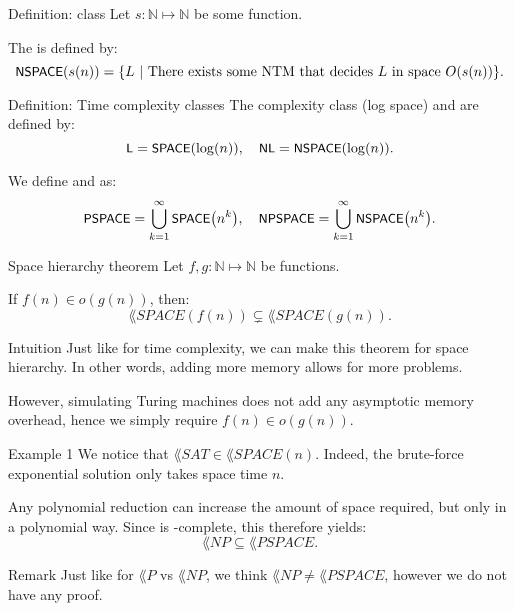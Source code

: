 \documentclass[a4paper]{article}
\begin{document}
\begin{parag}{Definition:  class}
    Let $s: \mathbb{N} \mapsto \mathbb{N}$ be some function.

    The  is defined by:
    \[\lang{NSPACE}\left(s\left(n\right)\right) = \left\{L \suchthat \text{There exists some NTM that decides $L$ in space $O\left(s\left(n\right)\right)$}\right\}.\]
\end{parag}

\begin{parag}{Definition: Time complexity classes}
    The complexity class  (log space) and  are defined by: 
    \[\lang{L} = \lang{SPACE}\left(\log\left(n\right)\right), \mathspace \lang{NL} = \text{\lang{NSPACE}}\left(\log\left(n\right)\right).\]

    We define  and  as:
    \[\lang{PSPACE} = \bigcup_{k=1}^{\infty} \lang{SPACE}\left(n^k\right), \mathspace \lang{NPSPACE} = \bigcup_{k=1}^{\infty} \lang{NSPACE}\left(n^k\right).\]
\end{parag}

\begin{parag}{Space hierarchy theorem}
    Let $f, g: \mathbb{N} \mapsto \mathbb{N}$ be functions.

    If $f\left(n\right) \in o\left(g\left(n\right)\right)$, then: 
    \[\lang{SPACE}\left(f\left(n\right)\right) \subsetneq \lang{SPACE}\left(g\left(n\right)\right).\]

    \begin{subparag}{Intuition}
        Just like for time complexity, we can make this theorem for space hierarchy. In other words, adding more memory allows for more problems.

        However, simulating Turing machines does not add any asymptotic memory overhead, hence we simply require $f\left(n\right) \in o\left(g\left(n\right)\right)$.
    \end{subparag}
\end{parag}

\begin{parag}{Example 1}
    We notice that $\lang{SAT} \in \lang{SPACE}\left(n\right)$. Indeed, the brute-force exponential solution only takes space time $n$.

    Any polynomial reduction can increase the amount of space required, but only in a polynomial way. Since  is -complete, this therefore yields: 
    \[\lang{NP} \subseteq \lang{PSPACE}.\]

    \begin{subparag}{Remark}
        Just like for $\lang{P}$ vs $\lang{NP}$, we think $\lang{NP} \neq \lang{PSPACE}$, however we do not have any proof.
    \end{subparag}
\end{parag}
\end{document}
